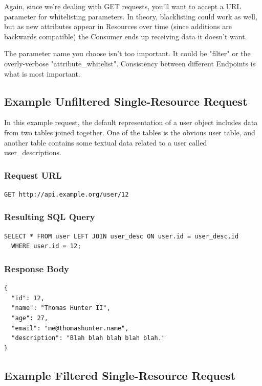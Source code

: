 \documentclass{book}
\begin{document}
Again, since we're dealing with GET requests, you'll want to accept a URL parameter for whitelisting parameters. In theory, blacklisting could work as well, but as new attributes appear in Resources over time (since additions are backwards compatible) the Consumer ends up receiving data it doesn't want.

The parameter name you choose isn't too important. It could be "filter" or the overly-verbose "attribute\_whitelist". Consistency between different Endpoints is what is most important.

\subsection{Example Unfiltered Single-Resource Request}

In this example request, the default representation of a user object includes data from two tables joined together. One of the tables is the obvious user table, and another table contains some textual data related to a user called user\_descriptions.

\subsubsection{Request URL}

\begin{verbatim}
GET http://api.example.org/user/12
\end{verbatim}

\subsubsection{Resulting SQL Query}

\begin{verbatim}
SELECT * FROM user LEFT JOIN user_desc ON user.id = user_desc.id
  WHERE user.id = 12;
\end{verbatim}

\subsubsection{Response Body}

\begin{verbatim}
{
  "id": 12,
  "name": "Thomas Hunter II",
  "age": 27,
  "email": "me@thomashunter.name",
  "description": "Blah blah blah blah blah."
}
\end{verbatim}

\subsection{Example Filtered Single-Resource Request}
\end{document}

